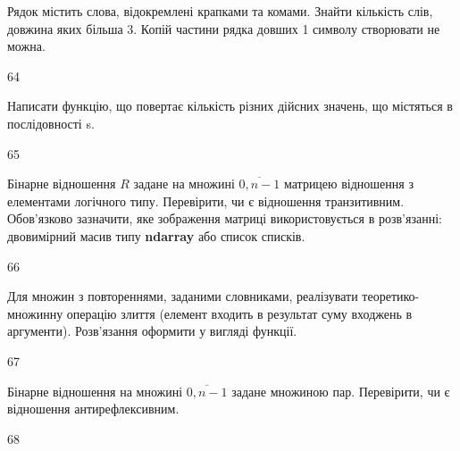 Рядок містить слова, відокремлені крапками та комами. Знайти кількість слів, довжина яких більша 3. Копій частини рядка довших 1 символу створювати не можна.
\\\par
64 














Написати функцію, що повертає кількість різних дійсних значень, що містяться в послідовності s.
\\\par
65 














Бінарне відношення $R$ задане на множині $\overline{0,n-1}$ матрицею відношення з елементами логічного типу. Перевірити, чи є відношення транзитивним. Обов'язково зазначити, яке зображення матриці використовується в розв'язанні: двовимірний масив типу \textbf{ndarray} або список списків.
\\\par
66 














Для множин з повтореннями, заданими словниками, реалізувати теоретико-множинну операцію злиття (елемент входить в результат суму входжень в аргументи). Розв’язання оформити у вигляді функції.
\\\par
67 














Бінарне відношення на множині $\overline{0,n-1}$ задане множиною пар. Перевірити, чи є відношення антирефлексивним.
\\\par
68 














